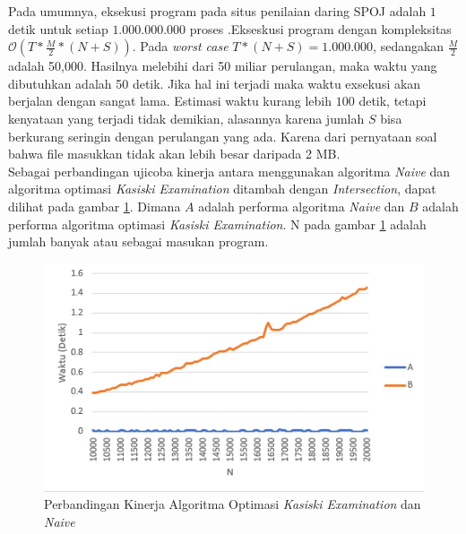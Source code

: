 Pada umumnya, eksekusi program pada situs penilaian daring SPOJ adalah $ 1 $ detik untuk setiap $ 1.000.000.000 $ proses .Ekseskusi program dengan kompleksitas $\mathcal{O}(T*\frac{M}{2}*(N+S))$. Pada \textit{worst case} $T*(N+S)=1.000.000$, sedangakan $\frac{M}{2}$ adalah 50,000. Hasilnya melebihi dari 50 miliar perulangan, maka waktu yang dibutuhkan adalah 50 detik. Jika hal ini terjadi maka waktu exsekusi akan berjalan dengan sangat lama. Estimasi waktu kurang lebih $100$ detik, tetapi kenyataan yang terjadi tidak demikian, alasannya karena jumlah $S$ bisa berkurang seringin dengan perulangan yang ada. Karena dari pernyataan soal bahwa file masukkan tidak akan lebih besar daripada 2 MB\cite{piwakowski_crypto4_2004}.
\\
Sebagai perbandingan ujicoba kinerja antara menggunakan algoritma \textit{Naive} dan algoritma optimasi \textit{Kasiski Examination} ditambah dengan \textit{Intersection}, dapat dilihat pada gambar \ref{fig:banding}. Dimana $A$ adalah performa algoritma \textit{Naive} dan $B$ adalah performa algoritma optimasi \textit{Kasiski Examination}. N pada gambar \ref{fig:banding} adalah jumlah banyak \plaintext atau \ciphertext sebagai masukan program.
	
	\begin{figure}[H]
	\centering
  	\includegraphics[scale=0.7]{images/bab5/b.png}
  	\caption{Perbandingan Kinerja Algoritma Optimasi \textit{Kasiski Examination} dan \textit{Naive}}
  	\label{fig:banding}
	\end{figure}
